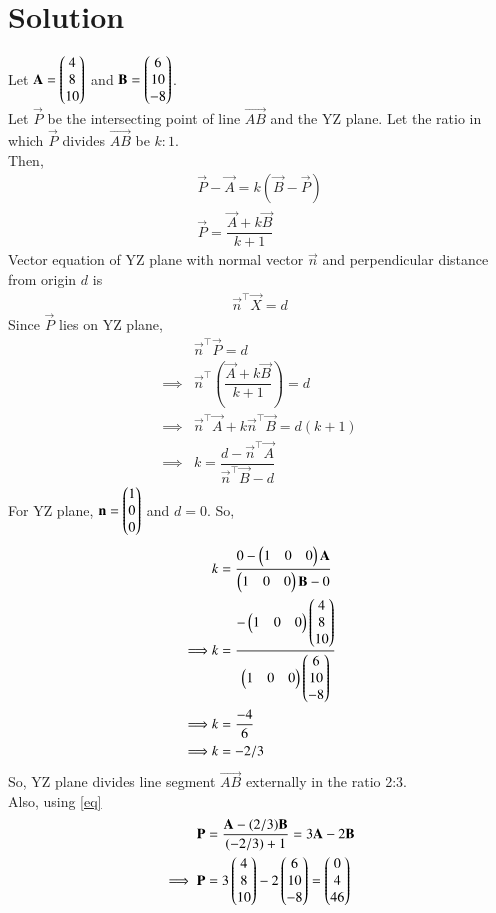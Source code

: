 \documentclass[journal,12pt,twocolumn]{IEEEtran}
\begin{document}
\section{Solution}
Let $\mathbf{A} = \begin{pmatrix}4\\8\\10\end{pmatrix}$ and $\mathbf{B} = \begin{pmatrix}6\\10\\-8\end{pmatrix}$.\\
Let $\vec{P}$ be the intersecting point of line $\vec{AB}$ and the YZ plane.
Let the ratio in which $\vec{P}$ divides $\vec{AB}$ be $k:1$.\\
Then,
\begin{align}
    \vec{P}-\vec{A} = k(\vec{B}-\vec{P})\\
    \vec{P}=\dfrac{\vec{A}+k\vec{B}}{k+1} \label{eq}
\end{align}
Vector equation of YZ plane with normal vector $\vec{n}$ and perpendicular distance from origin $d$ is
\begin{align}
    \vec{n}^\top\vec{X}=d
\end{align}
Since $\vec{P}$ lies on YZ plane,
\begin{align}
    &\vec{n}^\top\vec{P}=d\\
    \implies &\vec{n}^\top\left(\dfrac{\vec{A}+k\vec{B}}{k+1}\right)=d\\
    \implies &\vec{n}^\top\vec{A}+k\vec{n}^\top\vec{B}=d(k+1)\\
    \implies &k=\dfrac{d-\vec{n}^\top\vec{A}}{\vec{n}^\top\vec{B}-d}
\end{align}
For YZ plane, $\mathbf{n}=\begin{pmatrix}1\\0\\0\end{pmatrix}$ and $d=0$. So,
\begin{align}
    &k=\dfrac{0-\begin{pmatrix}1 & 0 & 0\end{pmatrix}\mathbf{A}}{\begin{pmatrix}1 & 0 & 0\end{pmatrix}\mathbf{B}-0}\\
    \implies &k=\dfrac{-\begin{pmatrix}1 & 0 & 0\end{pmatrix}\begin{pmatrix}4\\8\\10\end{pmatrix}}{\begin{pmatrix}1 & 0 & 0\end{pmatrix}\begin{pmatrix}6\\10\\-8\end{pmatrix}}\\
    \implies &k=\dfrac{-4}{6}\\
    \implies &k=-2/3
\end{align}
So, YZ plane divides line segment $\vec{AB}$ externally in the ratio 2:3.\\
Also, using \eqref{eq}
\begin{align}
    \mathbf{P}&=\dfrac{\mathbf{A}-(2/3)\mathbf{B}}{(-2/3)+1}=3\mathbf{A}-2\mathbf{B}\\
    \implies \mathbf{P}&=3\begin{pmatrix}4\\8\\10\end{pmatrix}-2\begin{pmatrix}6\\10\\-8\end{pmatrix}=\begin{pmatrix}0\\4\\46\end{pmatrix}
\end{align}
\end{document}
